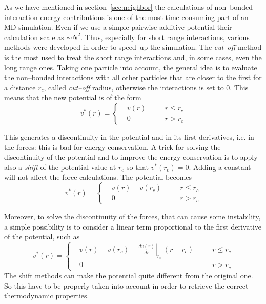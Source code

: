 As we have mentioned in section~\ref{sec:neighbor} the calculations of non--bonded interaction energy
contributions is one of the most time consuming part of an \ac{MD} simulation. Even if we use a simple pairwise
additive potential their calculation scale as $\sim N^2$. Thus, especially for short range interactions, various
methods were developed in order to speed--up the simulation. The \textit{cut--off} method is the most used to
treat the short range interactions and, in some cases, even the long range ones. Taking one particle into
account, the general idea is to evaluate the non--bonded interactions with all other particles that are closer to
the first for a distance $r_c$, called \textit{cut--off} radius, otherwise the interactions is set to $0$. This
means that the new potential is of the form
\begin{equation*}
v^*(r) = \left \{
	\begin{aligned}
&v(r) & \quad & r \le r_c \\
&0    & \quad & r >   r_c
	\end{aligned} \right .
\end{equation*}

This generates a discontinuity in the potential and in its first derivatives, i.e. in the forces: this is bad for
energy conservation. A trick for solving the discontinuity of the potential and to improve the energy
conservation is to apply also a \textit{shift} of the potential value at $r_c$ so that $v^*(r_c) = 0$. Adding a
constant will not affect the force calculations. The potential becomes
\begin{equation*}
v^*(r) = \left \{
	\begin{aligned}
&v(r) - v(r_c) & \quad & r \le r_c \\
&0    & \quad  & r >   r_c
	\end{aligned} \right .
\end{equation*}

Moreover, to solve the discontinuity of the forces, that can cause some instability, a simple possibility is to
consider a linear term proportional to the first derivative of the potential, such as
\begin{equation*}
v^*(r) = \left \{
	\begin{aligned}
&v(r) - v(r_c) - \left . \frac{dv(r)}{dr}\right |_{r_c}\ (r - r_c) & \quad & r \le r_c \\
&0    & \quad  & r >   r_c
	\end{aligned} \right .
\end{equation*}
The shift methods can make the potential quite different from the original one. So this have to be properly taken
into account in order to retrieve the correct thermodynamic properties.

